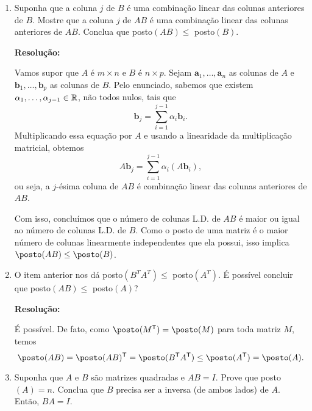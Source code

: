 \documentclass[leqno]{article}
\numberwithin{equation}{section}
\newcommand{\bfa}{\mathbf{a}}
\newcommand{\bfb}{\mathbf{b}}
\newenvironment{sol}
{
    \vspace{4mm}
    \noindent\textbf{Resolução:}
    \strut\newline
    \smallskip
    \hspace{-3.5mm}
}
{}
\begin{document}
\begin{enumerate}
    \item Suponha que a coluna $j$ de $B$ é uma combinação linear das colunas anteriores de $B$. Mostre que a coluna $j$ de $AB$ é uma combinação linear das colunas anteriores de $AB$. Conclua que posto$(AB) \leq $ posto$(B)$.

        \begin{sol} 
            Vamos supor que \( A \) é \( m \times n \) e \( B \) é \( n \times p \).
            Sejam \( \bfa_{ 1 }, \dots, \bfa_{ n } \) as colunas de \( A \) e \( \bfb_{ 1 }, \dots, \bfb_{ p } \) as colunas de \( B \).
            Pelo enunciado, sabemos que existem \( \alpha_{ 1 }, \dots, \alpha_{ j-1 } \in \mathbb{R} \), não todos nulos, tais que
            \begin{equation*}
                \bfb_{ j } = \sum_{ i=1 }^{ j-1 } \alpha_{ i } \bfb_{ i }
            .\end{equation*}
            Multiplicando essa equação por \( A \) e usando a linearidade da multiplicação matricial, obtemos
            \begin{equation*}
                A \bfb_{ j } = \sum_{ i=1 }^{ j-1 } \alpha_{ i } ( A \bfb_{ i } )
            ,\end{equation*}
            ou seja, a \( j \)-ésima coluna de \( AB \) é combinação linear das colunas anteriores de \( AB \).

            Com isso, concluímos que o número de colunas L.D. de \( AB \) é maior ou igual ao número de colunas L.D. de \( B \).
            Como o posto de uma matriz é o maior número de colunas linearmente independentes que ela possui, isso implica \( \posto ( AB ) \leq \posto ( B ) \).
        \end{sol} 

    \item O item anterior nos dá posto$(B^T A^T) \leq $ posto$(A^T)$. É possível concluir que posto$(AB) \leq $ posto$(A)$?

        \begin{sol} 
            É possível.
            De fato, como \( \posto ( M^{ \transpose } ) = \posto ( M ) \) para toda matriz \( M \), temos
            \begin{equation*}
                \posto ( AB ) = \posto ( AB )^{ \transpose } = \posto ( B^{ \transpose } A^{ \transpose } ) \leq \posto ( A^{ \transpose } ) = \posto ( A )
            .\end{equation*}
        \end{sol} 

    \item Suponha que $A$ e $B$ são matrizes quadradas e $AB = I$. Prove que posto$(A) = n$. Conclua que $B$ precisa ser a inversa (de ambos lados) de $A$. Então, $BA = I$.


\end{enumerate}
\end{document}
